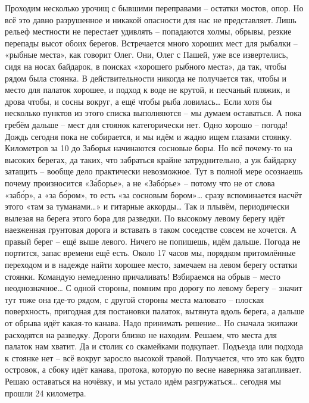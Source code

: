 Проходим несколько урочищ с бывшими переправами – остатки мостов, опор. Но всё это давно разрушенное и никакой опасности для нас не представляет. Лишь рельеф местности не перестает удивлять – попадаются холмы, обрывы, резкие перепады высот обоих берегов. Встречается много хороших мест для рыбалки – «рыбные места», как говорит Олег. Они, Олег с Пашей, уже все извертелись, сидя на носах байдарок, в поисках «хорошего рыбного места», да так, чтобы рядом была стоянка. В действительности никогда не получается так, чтобы и место для палаток хорошее, и подход к воде не крутой, и песчаный пляжик, и дрова чтобы, и сосны вокруг, а ещё чтобы рыба ловилась… Если хотя бы несколько пунктов из этого списка выполняются – мы думаем оставаться. А пока гребём дальше – мест для стоянок категорически нет.
Одно хорошо – погода! Дождь сегодня пока не собирается, и мы идём и жадно ищем глазами  стоянку. Километров за 10 до Заборья начинаются сосновые боры. Но всё почему-то на высоких берегах, да таких, что забраться крайне затруднительно, а уж байдарку затащить – вообще дело практически невозможное. Тут в полной мере осознаешь почему произносится «З\'{а}борье», а не «Заб\'{о}рье» – потому что не от слова «заб\'{о}р», а «за б\'{о}ром», то есть «за сосновым бором»… сразу вспоминается насчёт этого «там за туманами…» и гитарные аккорды… Так и плывём, периодически вылезая на берега этого бора для разведки.
По высокому левому берегу идёт наезженная грунтовая дорога и вставать в таком соседстве совсем не хочется. А правый берег – ещё выше левого. Ничего не попишешь, идём дальше. Погода не портится, запас времени ещё есть. Около 17 часов мы, порядком притомлённые переходом и в надежде найти хорошее место, замечаем на левом берегу остатки стоянки. Командую немедленно причаливать! Взбираемся на обрыв – место неоднозначное… С одной стороны, помним про дорогу по левому берегу – значит тут тоже она где-то рядом, с другой стороны места маловато – плоская поверхность, пригодная для постановки палаток, вытянута вдоль берега, а дальше от обрыва идёт какая-то канава. Надо принимать решение… Но сначала экипажи расходятся на разведку. Дороги близко не находим. Решаем, что места для палаток нам хватит. Да и столик со скамейками подкупает. Подъезда или подхода к стоянке нет – всё вокруг заросло высокой травой. Получается, что это как будто островок, а сбоку идёт канава, протока, которую по весне наверняка затапливает. Решаю оставаться на ночёвку, и мы устало идём разгружаться… сегодня мы прошли 24 километра.
